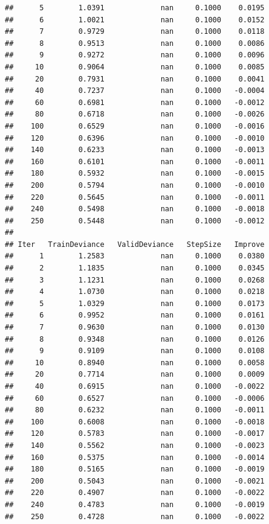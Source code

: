 \documentclass[]{book}
\begin{document}
\begin{verbatim}
##      5        1.0391             nan     0.1000    0.0195
##      6        1.0021             nan     0.1000    0.0152
##      7        0.9729             nan     0.1000    0.0118
##      8        0.9513             nan     0.1000    0.0086
##      9        0.9272             nan     0.1000    0.0096
##     10        0.9064             nan     0.1000    0.0085
##     20        0.7931             nan     0.1000    0.0041
##     40        0.7237             nan     0.1000   -0.0004
##     60        0.6981             nan     0.1000   -0.0012
##     80        0.6718             nan     0.1000   -0.0026
##    100        0.6529             nan     0.1000   -0.0016
##    120        0.6396             nan     0.1000   -0.0010
##    140        0.6233             nan     0.1000   -0.0013
##    160        0.6101             nan     0.1000   -0.0011
##    180        0.5932             nan     0.1000   -0.0015
##    200        0.5794             nan     0.1000   -0.0010
##    220        0.5645             nan     0.1000   -0.0011
##    240        0.5498             nan     0.1000   -0.0018
##    250        0.5448             nan     0.1000   -0.0012
## 
## Iter   TrainDeviance   ValidDeviance   StepSize   Improve
##      1        1.2583             nan     0.1000    0.0380
##      2        1.1835             nan     0.1000    0.0345
##      3        1.1231             nan     0.1000    0.0268
##      4        1.0730             nan     0.1000    0.0218
##      5        1.0329             nan     0.1000    0.0173
##      6        0.9952             nan     0.1000    0.0161
##      7        0.9630             nan     0.1000    0.0130
##      8        0.9348             nan     0.1000    0.0126
##      9        0.9109             nan     0.1000    0.0108
##     10        0.8940             nan     0.1000    0.0058
##     20        0.7714             nan     0.1000    0.0009
##     40        0.6915             nan     0.1000   -0.0022
##     60        0.6527             nan     0.1000   -0.0006
##     80        0.6232             nan     0.1000   -0.0011
##    100        0.6008             nan     0.1000   -0.0018
##    120        0.5783             nan     0.1000   -0.0017
##    140        0.5562             nan     0.1000   -0.0023
##    160        0.5375             nan     0.1000   -0.0014
##    180        0.5165             nan     0.1000   -0.0019
##    200        0.5043             nan     0.1000   -0.0021
##    220        0.4907             nan     0.1000   -0.0022
##    240        0.4783             nan     0.1000   -0.0019
##    250        0.4728             nan     0.1000   -0.0022

\end{verbatim}
\end{document}
